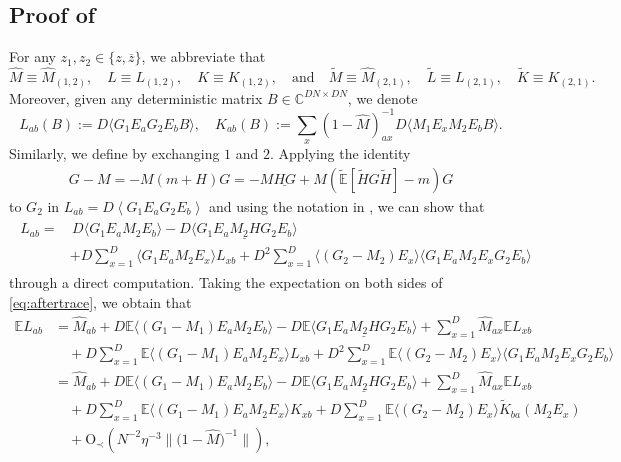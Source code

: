 \documentclass[10pt,reqno]{amsart}
\numberwithin{equation}{section}
\numberwithin{figure}{section}
\theoremstyle{plain} %
\theoremstyle{definition} %
\newcommand{\wh}{\widehat}
\newcommand{\wt}{\widetilde}
\newcommand{\E}{\mathbb{E}}
\newcommand{\C}{\mathbb{C}}
\newcommand{\pa}[1]{\left({#1}\right)}
\newcommand{\avga}[1]{\left\langle #1 \right\rangle}
\newcommand{\OO}{\mathrm{O}}
\numberwithin{equation}{section}
\begin{document}
\subsection{Proof of }\label{proof_of_lemma_G_large_2}

For any $z_1, z_2\in \{z, \overline{z}\}$, we abbreviate that 
$$\wh M\equiv \wh M_{(1,2)},\quad L\equiv L_{(1,2)},\quad K\equiv K_{(1,2)},\quad \text{and}\quad \wt M\equiv \wh M_{(2,1)},\quad \wt L\equiv L_{(2,1)}, \quad \wt K\equiv K_{(2,1)}.$$
Moreover, given any deterministic matrix $B\in \C^{DN\times DN}$, we denote 
$$L_{ab}(B):=D\langle G_1 E_a G_2 E_b B\rangle,\quad K_{ab}(B):=\sum_x (1-\wh M)^{-1}_{ax}D\langle M_1 E_x M_2 E_b B\rangle. $$
Similarly, we define \smash{$\wt L_{ab}(B)$ and $\wt K_{ab}(B)$} by exchanging $1$ and $2$. Applying the identity 
\begin{equation}\nonumber
    \begin{aligned}
        G - M = -M(m + H)G = -M\underline{HG} + M(\widetilde{\E}[\widetilde{H}G\widetilde{H}] - m)G
    \end{aligned}
\end{equation}
to $G_2$ in $L_{ab}=D\avga{G_1E_aG_2E_b}$ and using the notation in , we can show that
\begin{align}
\begin{split}
L_{ab} = &\,D\langle G_1E_aM_2E_b\rangle - D\langle \underline{G_1E_aM_2HG_2E_b}\rangle \\
&+ D \sum_{x=1}^D \langle G_1E_aM_2E_x\rangle L_{xb} + D^2\sum_{x=1}^D \langle (G_2 - M_2) E_x\rangle \langle G_1E_aM_2E_xG_2E_b\rangle
\end{split}\label{eq:aftertrace}
\end{align}
through a direct computation. Taking the expectation on both sides of \eqref{eq:aftertrace}, we obtain that
\begin{align}
\E L_{ab} &= \wh{M}_{ab} + D\E\langle (G_1-M_1)E_aM_2E_b\rangle - D\E\langle \underline{G_1E_aM_2HG_2E_b}\rangle + \sum_{x=1}^D \wh M_{ax} \E L_{xb} \nonumber\\
&\quad + D\sum_{x=1}^D \E\langle (G_1 - M_1)E_aM_2E_x\rangle L_{xb} + D^2\sum_{x=1}^D \E\langle (G_2-M_2) E_x\rangle \langle G_1E_aM_2E_xG_2E_b\rangle \nonumber\\
&= \wh{M}_{ab} + D\E\langle (G_1-M_1)E_aM_2E_b\rangle - D\E\langle \underline{G_1E_aM_2HG_2E_b}\rangle + \sum_{x=1}^D \wh M_{ax} \E L_{xb} \nonumber\\
&\quad + D\sum_{x=1}^D \E\langle (G_1 - M_1)E_aM_2E_x\rangle K_{xb} + D\sum_{x=1}^D \E\langle (G_2-M_2) E_x\rangle \wt K_{ba}(M_2E_x)\nonumber\\
&\quad+\OO_\prec \pa{N^{-2}\eta^{-3}\big\|\big({1-\wh M}\big)^{-1}\big\|},\label{ELK}
\end{align}
\end{document}
